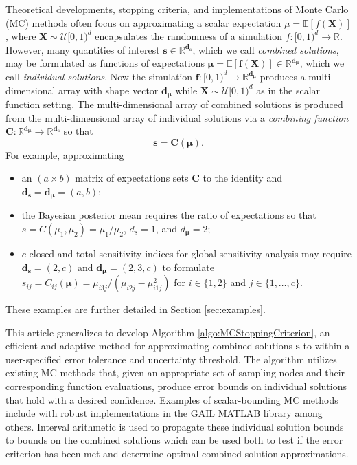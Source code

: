 \documentclass[graybox]{svmult}
\begin{document}
Theoretical developments, stopping criteria, and implementations of Monte Carlo (MC) methods often focus on approximating a scalar expectation $\mu = \mathbb{E}[f(\boldsymbol{X})]$, where $\boldsymbol{X} \sim \mathcal{U}[0,1)^d$ encapsulates the randomness of a simulation $f: [0,1)^d \to \mathbb{R}$. However, many quantities of interest $\boldsymbol{s} \in \mathbb{R}^{\boldsymbol{d}_{\boldsymbol{s}}}$, which we call \emph{combined solutions}, may be formulated as functions of expectations $\boldsymbol{\mu} = \mathbb{E}[\boldsymbol{f}(\boldsymbol{X})] \in \mathbb{R}^{\boldsymbol{d}_{\boldsymbol{\mu}}}$, which we call \emph{individual solutions}. Now the simulation $\boldsymbol{f}: [0,1)^{d} \to \mathbb{R}^{\boldsymbol{d}_{\boldsymbol{\mu}}}$ produces a multi-dimensional array with shape vector $\boldsymbol{d}_{\boldsymbol{\mu}}$ while $\boldsymbol{X} \sim \mathcal{U}[0,1)^d$ as in the scalar function setting. The multi-dimensional array of combined solutions is produced from the multi-dimensional array of individual solutions via a \emph{combining function} $\boldsymbol{C}: \mathbb{R}^{\boldsymbol{d}_{\boldsymbol{\mu}}} \to \mathbb{R}^{\boldsymbol{d}_{\boldsymbol{s}}}$ so that 
\begin{equation}
    \boldsymbol{s} = \boldsymbol{C}(\boldsymbol{\mu}).
    \label{eq:comb_from_indv}
\end{equation}
For example, approximating
\begin{itemize}
    \item an $(a \times b)$ matrix of expectations sets $\boldsymbol{C}$ to the identity and $\boldsymbol{d}_{\boldsymbol{s}} = \boldsymbol{d}_{\boldsymbol{\mu}} = (a,b)$;
    \item the Bayesian posterior mean requires the ratio of expectations so that $s = C(\mu_1,\mu_2) = \mu_1/\mu_2$, $d_s = 1$, and $d_{\boldsymbol{\mu}} = 2$;
    \item $c$ closed and total sensitivity indices for global sensitivity analysis may require $\boldsymbol{d}_{\boldsymbol{s}} = (2,c)$ and $\boldsymbol{d}_{\boldsymbol{\mu}} = (2,3,c)$ to formulate $s_{ij} = C_{ij}(\boldsymbol{\mu}) =  \mu_{i3j}/(\mu_{i2j}-\mu_{i1j}^2)$ for $i \in \{1,2\}$ and $j \in \{1,\dots,c\}$.
\end{itemize}
These examples are further detailed in Section \ref{sec:examples}.

This article generalizes \cite{adaptive_qmc} to develop Algorithm \ref{algo:MCStoppingCriterion}, an efficient and adaptive method for approximating combined solutions $\boldsymbol{s}$ to within a user-specified error tolerance and uncertainty threshold. The algorithm utilizes existing MC  methods that, given an appropriate set of sampling nodes and their corresponding function evaluations, produce error bounds on individual solutions that hold with a desired confidence. Examples of scalar-bounding MC methods include \cite{cubmcg,cubqmclattice,cubqmcsobol,cubqmcbayes_thesis,cubqmcbayeslattice} with robust implementations in the GAIL MATLAB library \cite{ChoEtal21a,hickernell2018monte} among others. Interval arithmetic is used to propagate these individual solution bounds to bounds on the combined solutions which can be used both to test if the error criterion has been met and determine optimal combined solution approximations. 
\end{document}
